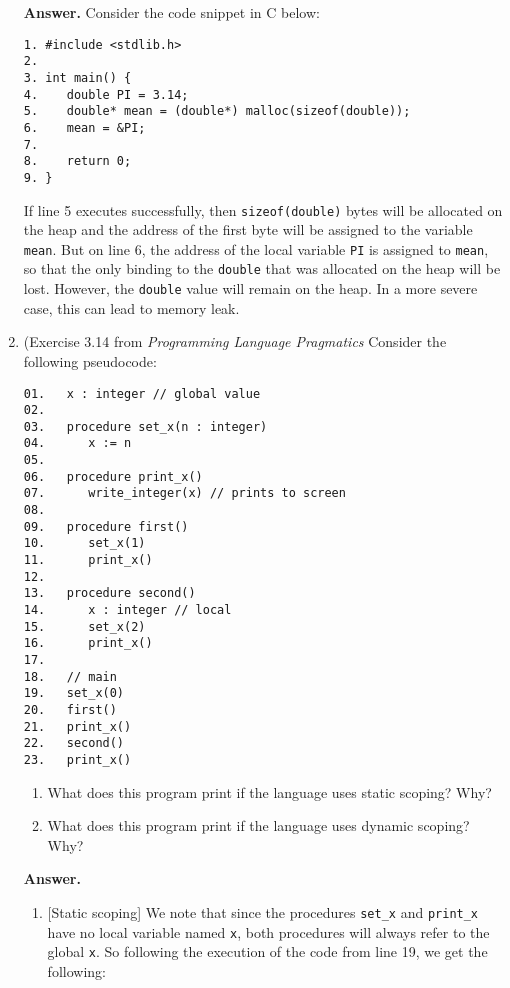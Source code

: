 \documentclass[9pt]{article}
\begin{document}
\begin{enumerate}
      \textbf{Answer.} Consider the code snippet in C below:
\begin{verbatim}
1. #include <stdlib.h>
2.
3. int main() {
4.    double PI = 3.14;
5.    double* mean = (double*) malloc(sizeof(double));
6.    mean = &PI;
7.
8.    return 0;
9. }
\end{verbatim}

If line 5 executes successfully, then \verb|sizeof(double)| bytes will be 
allocated on the heap and the address of the first byte will be assigned to the
variable \verb|mean|. But on line 6, the address of the local variable \verb|PI| 
is assigned to \verb|mean|, so that the only binding to the \verb|double| that 
was allocated on the heap will be lost. However, the \verb|double| value will 
remain on the heap. In a more severe case, this can lead to memory leak.
   \item (Exercise 3.14 from \textit{Programming Language Pragmatics} Consider
         the following pseudocode:
         \begin{verbatim}
01.   x : integer // global value
02.
03.   procedure set_x(n : integer)
04.      x := n
05.
06.   procedure print_x()
07.      write_integer(x) // prints to screen
08.
09.   procedure first()
10.      set_x(1)
11.      print_x()
12.
13.   procedure second()
14.      x : integer // local
15.      set_x(2)
16.      print_x()
17.
18.   // main
19.   set_x(0)
20.   first()
21.   print_x()
22.   second()
23.   print_x()
         \end{verbatim}

         \begin{enumerate}
            \item What does this program print if the language uses static 
                  scoping? Why?
            \item What does this program print if the language uses dynamic
                  scoping? Why?
         \end{enumerate}

      \textbf{Answer.}

      \begin{enumerate}
         \item {[}Static scoping{]} We note that since the procedures
               \verb|set_x| and \verb|print_x| have no local variable named 
               \verb|x|, both procedures will always refer to the global
               \verb|x|. So following the execution of the code from line 19, we 
               get the following:


\end{enumerate}
\end{enumerate}
\end{document}
